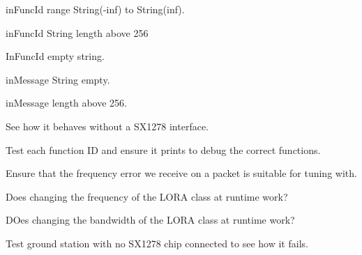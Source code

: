 
\begin{DoxyRefList}
\item[\label{test__test000001}%
\Hypertarget{test__test000001}%
Member \mbox{\hyperlink{communication_8h_a68fd88d1ccfc91925d30c0fdf1b417ab}{Communication\+\_\+\+S\+X1278\+Transmit}} (String in\+Func\+Id, String in\+Message)]in\+Func\+Id range String(-\/inf) to String(inf). 

in\+Func\+Id String length above 256 

In\+Func\+Id empty string. 

in\+Message String empty. 

in\+Message length above 256.  
\item[\label{test__test000003}%
\Hypertarget{test__test000003}%
Member \mbox{\hyperlink{ground__station_8cpp_afe461d27b9c48d5921c00d521181f12f}{loop}} ()]See how it behaves without a S\+X1278 interface. 

Test each function ID and ensure it prints to debug the correct functions. 

Ensure that the frequency error we receive on a packet is suitable for tuning with. 

Does changing the frequency of the L\+O\+RA class at runtime work? 

D\+Oes changing the bandwidth of the L\+O\+RA class at runtime work?  
\item[\label{test__test000002}%
\Hypertarget{test__test000002}%
Member \mbox{\hyperlink{ground__station_8cpp_a4fc01d736fe50cf5b977f755b675f11d}{setup}} ()]Test ground station with no S\+X1278 chip connected to see how it fails. 
\end{DoxyRefList}
